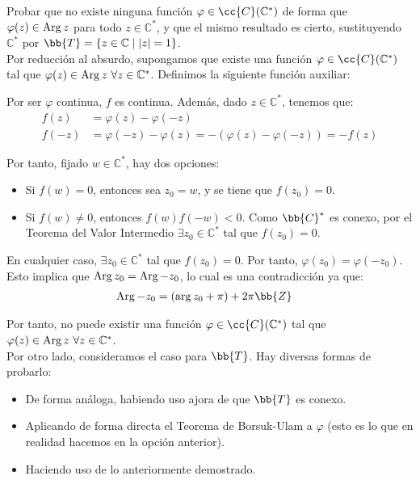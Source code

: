 \begin{ejercicio}
    Probar que no existe ninguna función $\varphi \in \cc{C}(\mathbb{C}^\ast)$ de forma que $\varphi(z) \in \operatorname{Arg} z$ para todo $z \in \mathbb{C}^\ast$, y que el mismo resultado es cierto, sustituyendo $\mathbb{C}^\ast$ por $\bb{T} = \{z \in \mathbb{C} \mid |z| = 1\}$.\\

    Por reducción al absurdo, supongamos que existe una función $\varphi\in \cc{C}(\mathbb{C}^{\ast})$ tal que $\varphi(z)\in \operatorname{Arg} z~\forall z\in \mathbb{C}^{\ast}$. Definimos la siguiente función auxiliar:

    Por ser $\varphi$ continua, $f$ es continua. Además, dado $z\in \mathbb{C}^{\ast}$, tenemos que:
    \begin{align*}
        f(z) &= \varphi(z)-\varphi(-z)\\
        f(-z) &= \varphi(-z)-\varphi(z) = -(\varphi(z)-\varphi(-z)) = -f(z)
    \end{align*}

    Por tanto, fijado $w\in \mathbb{C}^{\ast}$, hay dos opciones:
    \begin{itemize}
        \item Si $f(w)=0$, entonces sea $z_0=w$, y se tiene que $f(z_0)=0$.
        \item Si $f(w)\neq 0$, entonces $f(w)f(-w)<0$. Como $\bb{C}^{\ast}$ es conexo, por el Teorema del Valor Intermedio $\exists z_0\in \mathbb{C}^{\ast}$ tal que $f(z_0)=0$.
    \end{itemize}
    En cualquier caso, $\exists z_0\in \mathbb{C}^{\ast}$ tal que $f(z_0)=0$. Por tanto, $\varphi(z_0)=\varphi(-z_0)$. Esto implica que $\operatorname{Arg} z_0 = \operatorname{Arg} -z_0$, lo cual es una contradicción ya que:
    \begin{align*}
        \Arg -z_0 &= (\arg z_0 + \pi) + 2\pi\bb{Z}
    \end{align*}

    Por tanto, no puede existir una función $\varphi\in \cc{C}(\mathbb{C}^{\ast})$ tal que $\varphi(z)\in \operatorname{Arg} z~\forall z\in \mathbb{C}^{\ast}$.\\

    Por otro lado, consideramos el caso para $\bb{T}$. Hay diversas formas de probarlo:
    \begin{itemize}
        \item De forma análoga, habiendo uso ajora de que $\bb{T}$ es conexo.
        \item Aplicando de forma directa el Teorema de Borsuk-Ulam a $\varphi$ (esto es lo que en realidad hacemos en la opción anterior).
        \item Haciendo uso de lo anteriormente demostrado.
    \end{itemize}


\end{ejercicio}
